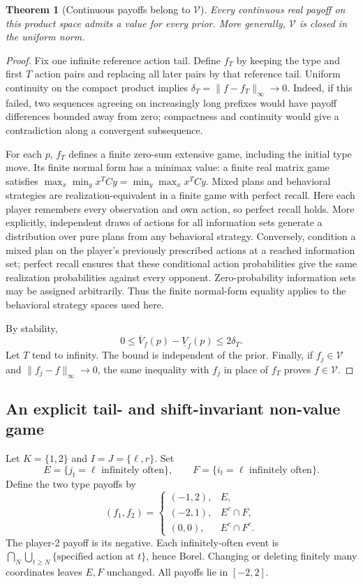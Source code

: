 \documentclass[11pt,a4paper]{article}
\newtheorem{theorem}{Theorem}[section]
\theoremstyle{definition}
\theoremstyle{remark}
\begin{document}
\begin{theorem}[Continuous payoffs belong to $\mathcal V$]
Every continuous real payoff on this product space admits a value for every prior. More generally, $\mathcal V$ is closed in the uniform norm.
\end{theorem}
\begin{proof}
Fix one infinite reference action tail. Define $f_T$ by keeping the type and first $T$ action pairs and replacing all later pairs by that reference tail. Uniform continuity on the compact product implies $\delta_T=\|f-f_T\|_\infty\to0$. Indeed, if this failed, two sequences agreeing on increasingly long prefixes would have payoff differences bounded away from zero; compactness and continuity would give a contradiction along a convergent subsequence.

For each $p$, $f_T$ defines a finite zero-sum extensive game, including the initial type move. Its finite normal form has a minimax value: a finite real matrix game satisfies $\max_x\min_y x^TCy=\min_y\max_xx^TCy$. Mixed plans and behavioral strategies are realization-equivalent in a finite game with perfect recall. Here each player remembers every observation and own action, so perfect recall holds. More explicitly, independent draws of actions for all information sets generate a distribution over pure plans from any behavioral strategy. Conversely, condition a mixed plan on the player's previously prescribed actions at a reached information set; perfect recall ensures that these conditional action probabilities give the same realization probabilities against every opponent. Zero-probability information sets may be assigned arbitrarily. Thus the finite normal-form equality applies to the behavioral strategy spaces used here.

By stability,
\[
 0\leq\overline V_f(p)-\underline V_f(p)\leq2\delta_T.
\]
Let $T$ tend to infinity. The bound is independent of the prior. Finally, if $f_j\in\mathcal V$ and $\|f_j-f\|_\infty\to0$, the same inequality with $f_j$ in place of $f_T$ proves $f\in\mathcal V$.
\end{proof}

\subsection{An explicit tail- and shift-invariant non-value game}
Let $K=\{1,2\}$ and $I=J=\{\ell,r\}$. Set
\[
 E=\{j_t=\ell\text{ infinitely often}\},\qquad
 F=\{i_t=\ell\text{ infinitely often}\}.
\]
Define the two type payoffs by
\[
 (f_1,f_2)=
 \begin{cases}
 (-1,2),&E,\\
 (-2,1),&E^c\cap F,\\
 (0,0),&E^c\cap F^c.
 \end{cases}
\]
The player-2 payoff is its negative. Each infinitely-often event is
$\bigcap_N\bigcup_{t\geq N}\{\text{specified action at }t\}$, hence Borel. Changing or deleting finitely many coordinates leaves $E,F$ unchanged. All payoffs lie in $[-2,2]$.
\end{document}

